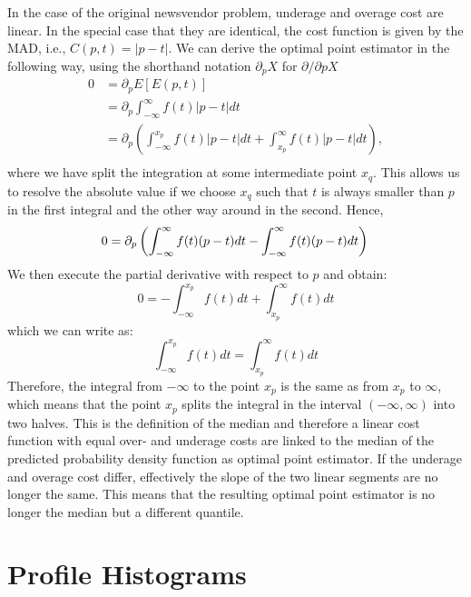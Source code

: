 \documentclass[BCOR=1mm, DIV=calc,10pt,
twoside=true,
twocolumn,
headings=normal]{scrartcl}
\begin{document}
In the case of the original newsvendor problem, underage and overage cost are linear. In the special case that they are identical, the cost function is given by the MAD, i.e., $C(p,t) = |p-t|$.
We can derive the optimal point estimator in the following way, using the shorthand notation $\partial_p X$ for $\partial/\partial p X$
\begin{align*}
0 &= \partial_p E[E(p,t)]  \\
&= \partial_p \int_{-\infty}^\infty f(t) |p-t| dt \\
&= \partial_p \left ( \int_{-\infty}^{x_p} f(t) |p-t| dt +  \int_{x_p}^\infty f(t) |p-t| dt \right ), \\
\end{align*}
where we have split the integration at some intermediate point $x_q$. This allows us to resolve the absolute value if we choose $x_q$ such that $t$ is always smaller than $p$ in the first integral and the other way around in the second. Hence,
\begin{equation}
0 = \partial_p \left ( \int_{-\infty}^\infty f(t) (p-t) dt -  \int_{-\infty}^\infty f(t) (p-t) dt \right ) \\
\end{equation}
We then execute the partial derivative with respect to $p$ and obtain:
\begin{equation}
0 = -  \int_{-\infty}^{x_p} f(t) dt + \int_{x_p}^\infty f(t)  dt
\end{equation}
which we can write as:
\begin{equation}
 \int_{-\infty}^{x_p} f(t) dt = \int_{x_p}^\infty f(t)  dt
\end{equation}
Therefore, the integral from $-\infty$ to the point $x_p$ is the same as from $x_p$ to $\infty$, which means that the point $x_p$ splits the integral in the interval $(-\infty, \infty)$ into two halves. This is the definition of the median and therefore a linear cost function with equal over- and underage costs are linked to the median of the predicted probability density function as optimal point estimator. If the underage and overage cost differ, effectively the slope of the two linear segments are no longer the same. This means that the resulting optimal point estimator is no longer the median but a different quantile. 

\section{Profile Histograms}
\label{sec:profile}
\end{document}

